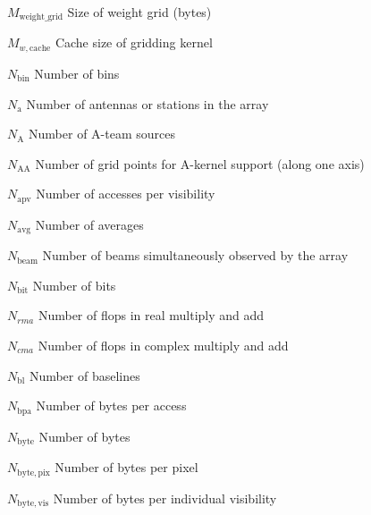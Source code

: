\documentclass[11pt,a4paper]{article}
\newcommand{\nbyteperpix}{N_\mathrm{byte,pix}} %
\newcommand{\wgridsize}{M_\mathrm{weight\_grid}} %
\newcommand{\gridcachesize}{M_{w,\mathrm{cache}}} %
\newcommand{\ntel}{N_\mathrm{a}} %
\newcommand{\nateam}{N_\mathrm{A}} %
\newcommand{\ngridpakern}{N_\mathrm{AA}} %
\newcommand{\naccvis}{N_\mathrm{apv}} %
\newcommand{\navg}{N_\mathrm{avg}} %
\newcommand{\nbins}{N_\mathrm{bin}} %
\newcommand{\nbeam}{N_\mathrm{beam}} %
\newcommand{\rma}{N_{rma}} %
\newcommand{\cma}{N_{cma}} %
\newcommand{\nbits}{N_\mathrm{bit}} %
\newcommand{\nbl}{N_\mathrm{bl}} %
\newcommand{\nbyteacc}{N_\mathrm{bpa}} %
\newcommand{\nbyte}{N_\mathrm{byte}} %
\newcommand{\nbytepervis}{N_\mathrm{byte,vis}} %
\begin{document}
\begin{basedescript}{\desclabelstyle{\pushlabel}\desclabelwidth{6em}}
\item[$\wgridsize$] Size of weight grid (bytes)\vspace{-0.2cm}
\item[$\gridcachesize$] Cache size of gridding kernel \vspace{-0.2cm}
\item[$\nbins$] Number of bins \vspace{-0.2cm}
\item[$\ntel$] Number of antennas or stations in the array
  \vspace{-0.2cm}
\item[$\nateam$] Number of A-team sources \vspace{-0.2cm}
\item[$\ngridpakern$] Number of grid points for A-kernel support (along one
  axis) \vspace{-0.2cm}
\item[$\naccvis$] Number of accesses per visibility \vspace{-0.2cm}
\item[$\navg$] Number of averages\vspace{-0.2cm}
\item[$\nbeam$] Number of beams simultaneously observed by the array
  \vspace{-0.2cm}
\item[$\nbits$] Number of bits\vspace{-0.2cm}
\item[$\rma$] Number of flops in real multiply and add\vspace{-0.2cm}
\item[$\cma$] Number of flops in complex multiply and add\vspace{-0.2cm}
\item[$\nbl$] Number of baselines \vspace{-0.2cm}
\item[$\nbyteacc$] Number of bytes per access \vspace{-0.2cm}
\item[$\nbyte$] Number of bytes \vspace{-0.2cm}
\item[$\nbyteperpix$] Number of bytes per pixel \vspace{-0.2cm}
\item[$\nbytepervis$] Number of bytes per individual visibility 


\end{basedescript}
\end{document}
